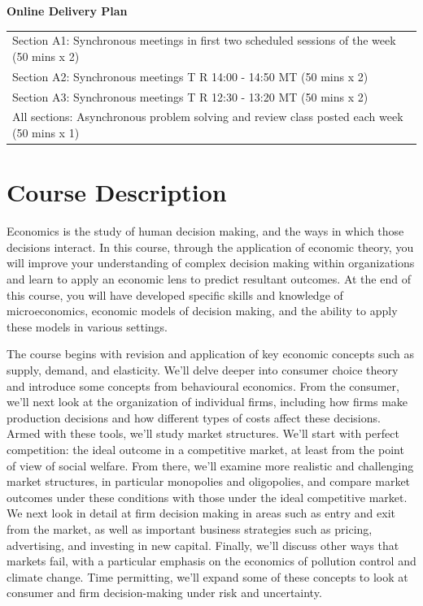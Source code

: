 \documentclass[11pt,]{article}
\begin{document}
\begin{center}
\textbf{Online Delivery Plan}\medskip\\
\begin{tabular}{l}
Section A1: Synchronous meetings in first two scheduled sessions of the week (50 mins x 2)\\
Section A2: Synchronous meetings T R 14:00 - 14:50 MT (50 mins x 2)\\
Section A3: Synchronous meetings T R 12:30 - 13:20 MT (50 mins x 2)\\
All sections: Asynchronous problem solving and review class posted each week (50 mins x 1) \\%
    \hline
    \end{tabular}
\end{center}

\hypertarget{course-description}{%
\section{Course Description}\label{course-description}}

Economics is the study of human decision making, and the ways in which
those decisions interact. In this course, through the application of
economic theory, you will improve your understanding of complex decision
making within organizations and learn to apply an economic lens to
predict resultant outcomes. At the end of this course, you will have
developed specific skills and knowledge of microeconomics, economic
models of decision making, and the ability to apply these models in
various settings.

The course begins with revision and application of key economic concepts
such as supply, demand, and elasticity. We'll delve deeper into consumer
choice theory and introduce some concepts from behavioural economics.
From the consumer, we'll next look at the organization of individual
firms, including how firms make production decisions and how different
types of costs affect these decisions. Armed with these tools, we'll
study market structures. We'll start with perfect competition: the ideal
outcome in a competitive market, at least from the point of view of
social welfare. From there, we'll examine more realistic and challenging
market structures, in particular monopolies and oligopolies, and compare
market outcomes under these conditions with those under the ideal
competitive market. We next look in detail at firm decision making in
areas such as entry and exit from the market, as well as important
business strategies such as pricing, advertising, and investing in new
capital. Finally, we'll discuss other ways that markets fail, with a
particular emphasis on the economics of pollution control and climate
change. Time permitting, we'll expand some of these concepts to look at
consumer and firm decision-making under risk and uncertainty.
\end{document}

